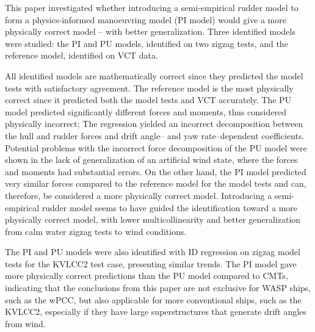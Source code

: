 %
This paper investigated whether introducing a semi-empirical rudder model to form a physics-informed manoeuvring model (PI model) would give a more physically correct model -- with better generalization.
Three identified models were studied: the PI and PU models, identified on two zigzag tests, and the reference model, identified on VCT data.

All identified models are mathematically correct since they predicted the model tests with satisfactory agreement.
The reference model is the most physically correct since it predicted both the model tests and VCT accurately.
The PU model predicted significantly different forces and moments, thus considered physically incorrect; 
The regression yielded an incorrect decomposition between the hull and rudder forces and drift angle-- and yaw rate--dependent coefficients.
Potential problems with the incorrect force decomposition of the PU model were shown in the lack of generalization of an artificial wind state, where the forces and moments had substantial errors.
On the other hand, the PI model predicted very similar forces compared to the reference model for the model tests and can, therefore, be considered a more physically correct model.
Introducing a semi-empirical rudder model seems to have guided the identification toward a more physically correct model, with lower multicollinearity and better generalization from calm water zigzag tests to wind conditions.

The PI and PU models were also identified with ID regression on zigzag model tests for the KVLCC2 test case, presenting similar trends. The PI model gave more physically correct predictions than the PU model compared to CMTs, indicating that the conclusions from this paper are not exclusive for WASP ships, such as the wPCC, but also applicable for more conventional ships, such as the KVLCC2, especially if they have large superstructures that generate drift angles from wind.

